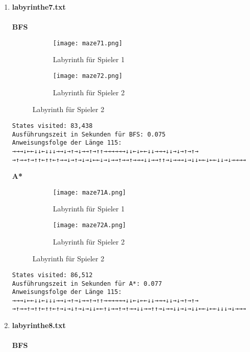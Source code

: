 \documentclass[a4paper,10pt,ngerman]{scrartcl}
\begin{document}
\begin{enumerate}
\begin{verbatim}
\end{verbatim}
\textbf{A*}
\begin{verbatim}
Labyrinth zu groß für diese A* Implementierung, verwende BFS! (ist schneller)
\end{verbatim}
  \item \textbf{labyrinthe7.txt}\\
\\\textbf{BFS}
\begin{figure}[H]
    \centering
    \begin{subfigure}{0.45\textwidth}
        \centering
        \texttt{[image: maze71.png]} 
        \caption{Labyrinth für Spieler 1}
    \end{subfigure}
    \hfill
    \begin{subfigure}{0.45\textwidth}
        \centering
        \texttt{[image: maze72.png]}
        \caption{Labyrinth für Spieler 2}
    \end{subfigure}
\end{figure}
\begin{verbatim}
States visited: 83,438
Ausführungszeit in Sekunden für BFS: 0.075
Anweisungsfolge der Länge 115: →→→↓←←↓↓←↓↓↓→→↓→↑→↓→→↑→↑↑→→→→→→↓↓←↓←←↓↓→→→↓↓→↓→↑→↑→
→↑→→↑→↑↑←↑↑←↑→→↓→↑→↓→↓←←↓→↓→→↑→→↑→→→↓↓→→↑↑→↓→→→↓→↓↓←←↓←←↓↓→↓→→→→
\end{verbatim}
\textbf{A*}
\begin{figure}[H]
    \centering
    \begin{subfigure}{0.45\textwidth}
        \centering
        \texttt{[image: maze71A.png]} 
        \caption{Labyrinth für Spieler 1}
    \end{subfigure}
    \hfill
    \begin{subfigure}{0.45\textwidth}
        \centering
        \texttt{[image: maze72A.png]}
        \caption{Labyrinth für Spieler 2}
    \end{subfigure}
\end{figure}
\begin{verbatim}
States visited: 86,512
Ausführungszeit in Sekunden für A*: 0.077
Anweisungsfolge der Länge 115: →→→↓←←↓↓←↓↓↓→→↓→↑→↓→→↑→↑↑→→→→→→↓↓←↓←←↓↓→→→↓↓→↓→↑→↑→
→↑→→↑→↑↑←↑↑←↑→↓→↓↑→↓→↓↓←←↑↓→→↑→↑→→↓↓→→↑↑→↓→→↓↓→↓→↓↓←←↓←←↓↓↓→↓→→→
\end{verbatim}
  \item \textbf{labyrinthe8.txt}\\
\\\textbf{BFS}
\begin{verbatim}

\end{verbatim}
\end{enumerate}
\end{document}
